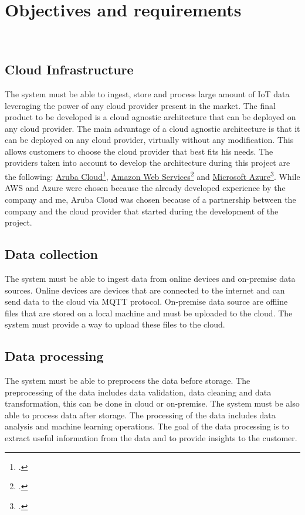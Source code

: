 \chapter{Objectives and requirements}
\label{cap:requirements}
\\

\section{Cloud Infrastructure}
The system must be able to ingest, store and process large amount of IoT data leveraging the power of any cloud provider present in the market. The final product to be developed is a cloud agnostic architecture that can be deployed on any cloud provider. The main advantage of a cloud agnostic architecture is that it can be deployed on any cloud provider, virtually without any modification. This allows customers to choose the cloud provider that best fits his needs.
The providers taken into account to develop the architecture during this project are the following: \href{https://www.arubacloud.com/}{Aruba Cloud}\footcite{site:aruba-cloud}, \href{https://aws.amazon.com/it/}{Amazon Web Services}\footcite{site:aws} and \href{https://azure.microsoft.com/it-it/}{Microsoft Azure}\footcite{site:azure}. 
While AWS and Azure were chosen because the already developed experience by the company and me, Aruba Cloud was chosen because of a partnership between the company and the cloud provider that started during the development of the project.\\


\section{Data collection}
The system must be able to ingest data from online devices and on-premise data sources. 
Online devices are devices that are connected to the internet and can send data to the cloud via MQTT protocol.
On-premise data source are offline files that are stored on a local machine and must be uploaded to the cloud. The system must provide a way to upload these files to the cloud.
\section{Data processing}
The system must be able to preprocess the data before storage. The preprocessing of the data includes data validation, data cleaning and data transformation, this can be done in cloud or on-premise. The system must be also able to process data after storage. The processing of the data includes data analysis and machine learning operations. The goal of the data processing is to extract useful information from the data and to provide insights to the customer.\\ 

